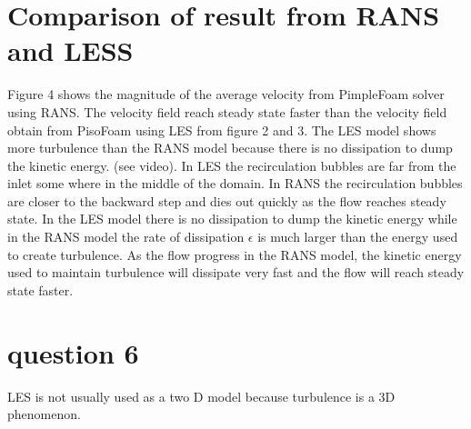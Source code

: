 \documentclass[10pt,a4paper]{report}
\begin{document}
\section{Comparison  of result from RANS and LESS}
Figure 4 shows the magnitude of the average velocity from PimpleFoam solver using RANS. The velocity field reach steady state faster than the velocity field obtain from PisoFoam using LES from figure 2 and 3. The LES model shows more turbulence than the RANS model because there is no dissipation to dump the kinetic energy. (see video). In LES the recirculation bubbles are far from the inlet some where in the middle of the domain. In RANS the recirculation bubbles are closer to the backward step and dies out quickly as the flow reaches steady state. In the LES model there is no dissipation to dump the kinetic energy while in the RANS model the rate of dissipation $\epsilon$ is much larger than the energy used to create turbulence. As the flow progress in the RANS model, the kinetic energy used to maintain turbulence will dissipate very fast and the flow will reach steady state faster. 
\section{ question 6}
LES is not usually used as a two D model because turbulence is a 3D phenomenon.
\end{document}
